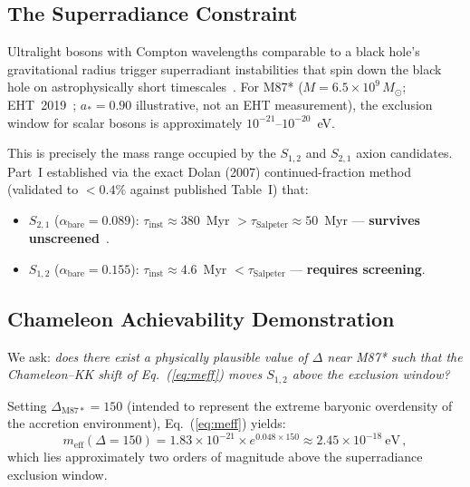 \documentclass[12pt]{article}
\begin{document}
\subsection{The Superradiance Constraint}

Ultralight bosons with Compton wavelengths comparable to a black hole's gravitational radius trigger superradiant instabilities that spin down the black hole on astrophysically short timescales~\cite{detweiler1980, dolan2007, arvanitaki2010}.
For M87* ($M = 6.5 \times 10^9 \, M_\odot$; EHT~2019~\cite{eht2019}; $a_* = 0.90$ illustrative, not an EHT measurement), the exclusion window for scalar bosons is approximately $10^{-21}$--$10^{-20}$~eV.

This is precisely the mass range occupied by the $S_{1,2}$ and $S_{2,1}$ axion candidates.
Part~I established via the exact Dolan (2007) continued-fraction method (validated to $<0.4\%$ against published Table~I) that:
\begin{itemize}
\item $S_{2,1}$ ($\alpha_{\mathrm{bare}} = 0.089$): $\tau_{\mathrm{inst}} \approx 380$~Myr $> \tau_{\mathrm{Salpeter}} \approx 50$~Myr --- \textbf{survives unscreened}~\cite{callens2026partI}.
\item $S_{1,2}$ ($\alpha_{\mathrm{bare}} = 0.155$): $\tau_{\mathrm{inst}} \approx 4.6$~Myr $< \tau_{\mathrm{Salpeter}}$ --- \textbf{requires screening}.
\end{itemize}

\subsection{Chameleon Achievability Demonstration}

We ask: \emph{does there exist a physically plausible value of $\Delta$ near M87* such that the Chameleon--KK shift of Eq.~(\ref{eq:meff}) moves $S_{1,2}$ above the exclusion window?}

Setting $\Delta_{\mathrm{M87*}} = 150$ (intended to represent the extreme baryonic overdensity of the accretion environment), Eq.~(\ref{eq:meff}) yields:
\begin{equation}
m_{\mathrm{eff}}(\Delta = 150) = 1.83 \times 10^{-21} \times e^{0.048 \times 150} \approx 2.45 \times 10^{-18}~\text{eV}\,,
\end{equation}
which lies approximately two orders of magnitude above the superradiance exclusion window.
\end{document}
